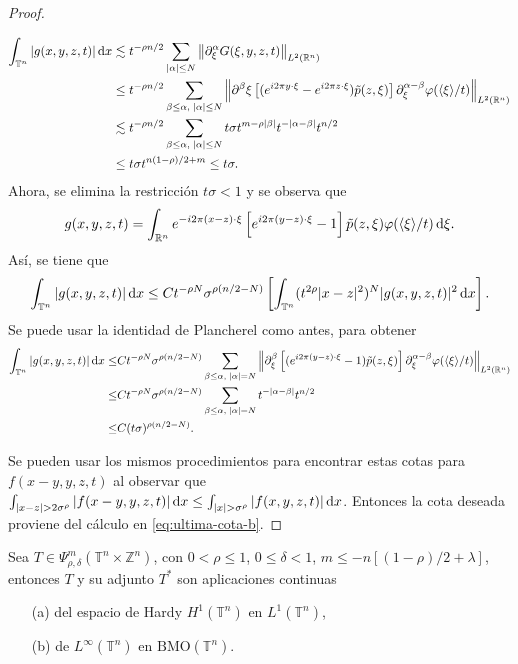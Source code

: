\begin{proof}
\begin{itemize}
		\begin{align*}
			\int_{\mathbb{T}^n}|g(x, y, z, t)|\mathop{}\!\mathrm{d} x  &\lesssim t^{-\rho n/2} \sum_{|\alpha|\leq N} \left\| \partial^\alpha_\xi G(\xi, y, z ,t) \right\|_{L^2(\mathbb{R}^n)}\\ 
			 & \leq t^{-\rho n/2} \sum_{\beta\leq\alpha,\;|\alpha|\leq N} \left\| \partial^\beta\xi \left[ (e^{i2\pi y \cdot \xi} -e^{i2\pi z \cdot \xi})  \tilde{p}(z, \xi)\right]  \partial^{\alpha-\beta}_\xi\varphi(\langle\xi\rangle/t)  \right\|_{L^2(\mathbb{R}^n)} \\
			 & \lesssim t^{-\rho n/2} \sum_{\beta\leq\alpha,\;|\alpha|\leq N} t\sigma t^{m-\rho|\beta|}t^{-|\alpha-\beta|}t^{n/2} \\
			& \leq t\sigma t^{n(1-\rho)/2 + m} \leq t\sigma.
		\end{align*}
		Ahora, se elimina la restricción $t\sigma<1$ y se observa que
		\begin{equation*}
			g(x, y, z, t) = \int_{\mathbb{R}^n} e^{-i2\pi (x-z) \cdot \xi} \left[ e^{i2\pi (y-z) \cdot \xi} -1 \right]\tilde{p}(z, \xi)\varphi(\langle\xi\rangle/t) \mathop{}\!\mathrm{d} \xi.
		\end{equation*}
		Así, se tiene que
		\begin{equation*}
			\int_{\mathbb{T}^n} |g(x, y, z, t)|\mathop{}\!\mathrm{d} x \leq Ct^{-\rho N}\sigma^{\rho(n/2 - N)} \left[ \int_{\mathbb{T}^n} (t^{2\rho}|x-z|^2)^N|g(x, y, z, t)|^2\mathop{}\!\mathrm{d} x \right].
		\end{equation*}
		Se puede usar la identidad de Plancherel como antes, para obtener
		\begin{align*}
			\int_{\mathbb{T}^n} |g(x, y, z, t)|\mathop{}\!\mathrm{d} x \leq & Ct^{-\rho N}\sigma^{\rho(n/2 - N)} \sum_{\beta\leq\alpha,\;|\alpha|=N} \left\| \partial^\beta_\xi \left[ (e^{i2\pi (y-z) \cdot \xi} -1)\tilde{p}(z, \xi) \right] \partial^{\alpha-\beta}_\xi\varphi(\langle\xi\rangle/t) \right\|_{L^2(\mathbb{R}^n)} \\
			\leq& Ct^{-\rho N}\sigma^{\rho(n/2 - N)} \sum_{\beta\leq\alpha,\;|\alpha|=N}t^{-|\alpha-\beta|}t^{n/2} \\
			\leq & C(t\sigma)^{\rho(n/2-N)}.
		\end{align*}
	\end{itemize}
	Se pueden usar los mismos procedimientos para encontrar estas cotas para $f(x-y, y,z, t)$ al observar que $\int_{|x-z|>2\sigma^\rho} |f(x-y, y,z, t)|\diff x \leq \int_{|x|>\sigma^\rho} |f(x, y,z, t)|\diff x$. Entonces la cota deseada proviene del cálculo en \cref{eq:ultima-cota-b}.
\end{proof}
\begin{theorem}\label{theo:L1-H1-L-infty-BMO}
	Sea $T \in \Psi^m_{\rho, \delta}(\mathbb{T}^n \times \mathbb{Z}^n) $, con $0 < \rho \leq 1$, $0 \leq \delta < 1$, $m \leq - n [(1-\rho)/2 + \lambda] $, entonces $T$ y su adjunto $T^*$ son aplicaciones continuas
	\begin{itemize}
		\item[(a)] del espacio de Hardy $H^1(\mathbb{T}^n)$ en $L^1(\mathbb{T}^n)$,
		\item[(b)] de $L^\infty(\mathbb{T}^n)$ en $\text{BMO}(\mathbb{T}^n)$.
	\end{itemize}
\end{theorem}
